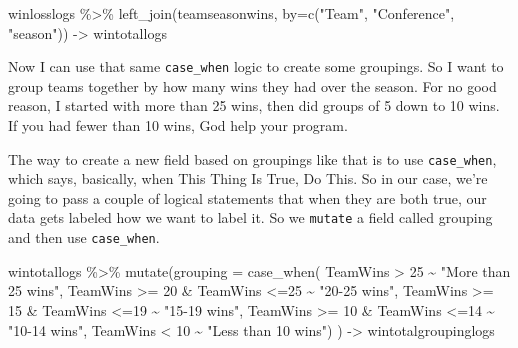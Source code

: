 \documentclass[
]{book}
\newenvironment{Shaded}{\begin{snugshade}}{\end{snugshade}}
\newcommand{\AttributeTok}[1]{\textcolor[rgb]{0.77,0.63,0.00}{#1}}
\newcommand{\DecValTok}[1]{\textcolor[rgb]{0.00,0.00,0.81}{#1}}
\newcommand{\FunctionTok}[1]{\textcolor[rgb]{0.00,0.00,0.00}{#1}}
\newcommand{\NormalTok}[1]{#1}
\newcommand{\OtherTok}[1]{\textcolor[rgb]{0.56,0.35,0.01}{#1}}
\newcommand{\SpecialCharTok}[1]{\textcolor[rgb]{0.00,0.00,0.00}{#1}}
\newcommand{\StringTok}[1]{\textcolor[rgb]{0.31,0.60,0.02}{#1}}
\begin{document}
\begin{Shaded}
\begin{Highlighting}[]
\NormalTok{winlosslogs }\SpecialCharTok{\%\textgreater{}\%} \FunctionTok{left\_join}\NormalTok{(teamseasonwins, }\AttributeTok{by=}\FunctionTok{c}\NormalTok{(}\StringTok{"Team"}\NormalTok{, }\StringTok{"Conference"}\NormalTok{, }\StringTok{"season"}\NormalTok{)) }\OtherTok{{-}\textgreater{}}\NormalTok{ wintotallogs}
\end{Highlighting}
\end{Shaded}

Now I can use that same \texttt{case\_when} logic to create some groupings. So I want to group teams together by how many wins they had over the season. For no good reason, I started with more than 25 wins, then did groups of 5 down to 10 wins. If you had fewer than 10 wins, God help your program.

The way to create a new field based on groupings like that is to use \texttt{case\_when}, which says, basically, when This Thing Is True, Do This. So in our case, we're going to pass a couple of logical statements that when they are both true, our data gets labeled how we want to label it. So we \texttt{mutate} a field called grouping and then use \texttt{case\_when}.

\begin{Shaded}
\begin{Highlighting}[]
\NormalTok{wintotallogs }\SpecialCharTok{\%\textgreater{}\%} \FunctionTok{mutate}\NormalTok{(}\AttributeTok{grouping =} \FunctionTok{case\_when}\NormalTok{(}
\NormalTok{  TeamWins }\SpecialCharTok{\textgreater{}} \DecValTok{25} \SpecialCharTok{\textasciitilde{}} \StringTok{"More than 25 wins"}\NormalTok{,}
\NormalTok{  TeamWins }\SpecialCharTok{\textgreater{}=} \DecValTok{20} \SpecialCharTok{\&}\NormalTok{ TeamWins }\SpecialCharTok{\textless{}=}\DecValTok{25} \SpecialCharTok{\textasciitilde{}} \StringTok{"20{-}25 wins"}\NormalTok{,}
\NormalTok{  TeamWins }\SpecialCharTok{\textgreater{}=} \DecValTok{15} \SpecialCharTok{\&}\NormalTok{ TeamWins }\SpecialCharTok{\textless{}=}\DecValTok{19} \SpecialCharTok{\textasciitilde{}} \StringTok{"15{-}19 wins"}\NormalTok{,}
\NormalTok{  TeamWins }\SpecialCharTok{\textgreater{}=} \DecValTok{10} \SpecialCharTok{\&}\NormalTok{ TeamWins }\SpecialCharTok{\textless{}=}\DecValTok{14} \SpecialCharTok{\textasciitilde{}} \StringTok{"10{-}14 wins"}\NormalTok{,}
\NormalTok{  TeamWins }\SpecialCharTok{\textless{}} \DecValTok{10} \SpecialCharTok{\textasciitilde{}} \StringTok{"Less than 10 wins"}\NormalTok{)}
\NormalTok{) }\OtherTok{{-}\textgreater{}}\NormalTok{ wintotalgroupinglogs}
\end{Highlighting}
\end{Shaded}
\end{document}
